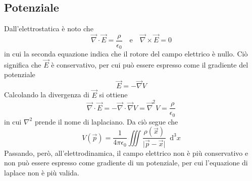\documentclass[a4paper]{extarticle}
\newcommand\dif{\mathop{}\!\mathrm{d}}
\begin{document}
\vspace{1em}
\subsection{Potenziale}
Dall'elettrostatica è noto che
\[\vec \nabla \cdot \vec E = \dfrac{\rho}{\epsilon_0} \hspace{1em} \text{e} \hspace{1em} \vec \nabla \times \vec E = 0\]
in cui la seconda equazione indica che il rotore del campo elettrico è nullo. Ciò significa che $\vec E$ è conservativo, per cui può essere espresso come il gradiente del potenziale
\[\vec E = - \vec \nabla V\]
Calcolando la divergenza di $\vec E$ si ottiene
\[\vec \nabla \cdot \vec E = - \vec \nabla \cdot \vec \nabla V = \vec \nabla^2 V = \dfrac{\rho}{\epsilon_0}\]
in cui $\nabla^2$ prende il nome di laplaciano. Da ciò segue che
\[V(\vec p) = \dfrac{1}{4 \pi \epsilon_0} \iiint \dfrac{\rho(\vec x)}{\vert \vec p - \vec x \vert} \dif^3 x\]
Passando, però, all'elettrodinamica, il campo elettrico non è più conservativo e non può essere espresso come gradiente di un potenziale, per cui l'equazione di laplace non è più valida.

\vspace{1em}
\end{document}
